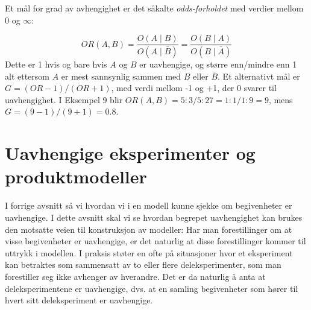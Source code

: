 Et mål for grad av avhengighet er det såkalte {\em odds-forholdet} 
med verdier mellom 0 og $\infty$:

\[    OR(A,B) = \frac{O(A\mid B)}{O(A\mid \bar{B})}=\frac{O(B\mid A)}{O(B\mid \bar{A})} \]
Dette er 1 hvis og bare hvis $A$ og $B$ er uavhengige, og større enn/mindre enn 1 
alt ettersom $A$ er mest sannsynlig sammen med $B$ eller $\bar B$.
Et alternativt mål er $G=(OR-1)/(OR+1)$, med verdi mellom -1 og +1, der 0
svarer til uavhengighet. 
I Eksempel 9 blir $OR(A,B)=5:3/5:27=1:1/1:9=9$, mens $G=(9-1)/(9+1)=0.8$. 

\section{Uavhengige eksperimenter og produkt\-modeller}

I forrige avsnitt så vi hvordan vi i en modell kunne sjekke om
begivenheter er uavhengige. I dette avsnitt skal vi se hvordan
begrepet uavhengighet kan brukes den motsatte veien til
konstruksjon av modeller: Har man forestillinger om at visse
begivenheter er uavhengige, er det naturlig at disse
forestillinger kommer til uttrykk i modellen.
I praksis støter en ofte på situasjoner hvor et eksperiment kan
betraktes som sammensatt av to eller flere deleksperimenter, som
man forestiller seg ikke avhenger av hverandre. Det er da
naturlig å anta at deleksperimentene er uavhengige, dvs. at en
samling begivenheter som hører til hvert sitt
deleksperiment er uavhengige.\\

